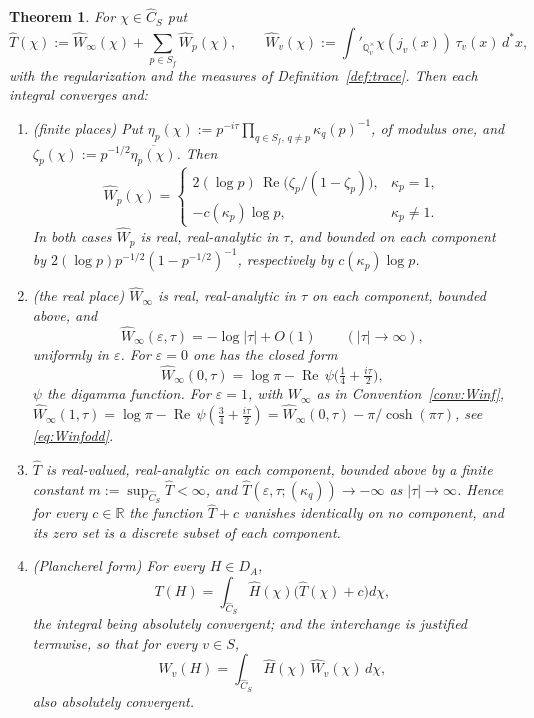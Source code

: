 \documentclass[11pt]{amsart}
\newtheorem{theorem}{Theorem}[section]
\theoremstyle{definition}
\theoremstyle{remark}
\newcommand{\R}{\mathbb R}
\newcommand{\Q}{\mathbb Q}
\newcommand{\dstar}{\,d^{*}}
\newcommand{\Rel}{\operatorname{Re}}
\newcommand{\Th}{\widehat{T}}
\newcommand{\Wh}{\widehat{W}}
\newcommand{\Ch}{\widehat{C}_S}
\newcommand{\DA}{D_A}
\begin{document}
\begin{theorem}\label{thm:symbol}
For $\chi\in\Ch$ put
\begin{equation}\label{eq:symboldef}
\Th(\chi):=\Wh_{\infty}(\chi)+\sum_{p\in S_f}\Wh_p(\chi),\qquad
\Wh_v(\chi):=\int'_{\Q_v^{\times}}\chi(j_v(x))\,\tau_v(x)\dstar x,
\end{equation}
with the regularization and the measures of Definition~\ref{def:trace}.  Then
each integral converges and:
\begin{enumerate}
\item[(a)] \emph{(finite places)}  Put
$\eta_p(\chi):=p^{-i\tau}\prod_{q\in S_f,\,q\ne p}\kappa_q(p)^{-1}$, of modulus
one, and $\zeta_p(\chi):=p^{-1/2}\overline{\eta_p(\chi)}$.  Then
\begin{equation}\label{eq:Wphat}
\Wh_p(\chi)=
\begin{cases}
2(\log p)\,\Rel\bigl(\zeta_p/(1-\zeta_p)\bigr), & \kappa_p=1,\\[2pt]
-c(\kappa_p)\log p, & \kappa_p\neq1 .
\end{cases}
\end{equation}
In both cases $\Wh_p$ is real, real-analytic in $\tau$, and bounded on each
component by $2(\log p)p^{-1/2}(1-p^{-1/2})^{-1}$, respectively by
$c(\kappa_p)\log p$.
\item[(b)] \emph{(the real place)}  $\Wh_{\infty}$ is real, real-analytic in
$\tau$ on each component, bounded above, and
\begin{equation}\label{eq:Winfhat}
\Wh_{\infty}(\varepsilon,\tau)=-\log|\tau|+O(1)\qquad(|\tau|\to\infty),
\end{equation}
uniformly in $\varepsilon$.  For $\varepsilon=0$ one has the closed form
\begin{equation}\label{eq:Winfclosed}
\Wh_{\infty}(0,\tau)=\log\pi-\Rel\,\psi\bigl(\tfrac14+\tfrac{i\tau}{2}\bigr),
\end{equation}
$\psi$ the digamma function.  For $\varepsilon=1$, with $W_{\infty}$ as in
Convention~\ref{conv:Winf}, $\Wh_{\infty}(1,\tau)=\log\pi-\Rel\,\psi(\tfrac34+
\tfrac{i\tau}2)=\Wh_{\infty}(0,\tau)-\pi/\cosh(\pi\tau)$, see
\eqref{eq:Winfodd}.
\item[(c)] $\Th$ is real-valued, real-analytic on each component, bounded above
by a finite constant $m:=\sup_{\Ch}\Th<\infty$, and
$\Th(\varepsilon,\tau;(\kappa_q))\to-\infty$ as $|\tau|\to\infty$.  Hence for
every $c\in\R$ the function $\Th+c$ vanishes identically on no component, and
its zero set is a discrete subset of each component.
\item[(d)] \emph{(Plancherel form)}  For every $H\in\DA$,
\begin{equation}\label{eq:plancherel}
T(H)=\int_{\Ch}\widehat H(\chi)\bigl(\Th(\chi)+c\bigr)d\chi ,
\end{equation}
the integral being absolutely convergent; and the interchange is justified
termwise, so that for every $v\in S$,
\begin{equation}\label{eq:plancherelv}
W_v(H)=\int_{\Ch}\widehat H(\chi)\,\Wh_v(\chi)\,d\chi ,
\end{equation}
also absolutely convergent.
\end{enumerate}
\end{theorem}
\end{document}
